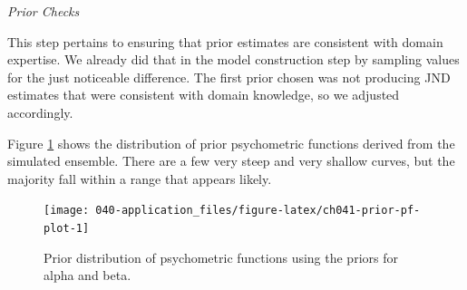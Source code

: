 \documentclass[11pt, oneside, openany]{scrbook}
\newenvironment{Shaded}{\begin{snugshade}}{\end{snugshade}}
\newcommand{\AttributeTok}[1]{\textcolor[rgb]{0.77,0.63,0.00}{#1}}
\newcommand{\ConstantTok}[1]{\textcolor[rgb]{0.00,0.00,0.00}{#1}}
\newcommand{\DecValTok}[1]{\textcolor[rgb]{0.00,0.00,0.81}{#1}}
\newcommand{\FloatTok}[1]{\textcolor[rgb]{0.00,0.00,0.81}{#1}}
\newcommand{\FunctionTok}[1]{\textcolor[rgb]{0.00,0.00,0.00}{#1}}
\newcommand{\NormalTok}[1]{#1}
\newcommand{\OtherTok}[1]{\textcolor[rgb]{0.56,0.35,0.01}{#1}}
\newcommand{\SpecialCharTok}[1]{\textcolor[rgb]{0.00,0.00,0.00}{#1}}
\begin{document}
\begin{Shaded}
\end{Shaded}


\emph{Prior Checks}

This step pertains to ensuring that prior estimates are consistent with domain expertise. We already did that in the model construction step by sampling values for the just noticeable difference. The first prior chosen was not producing JND estimates that were consistent with domain knowledge, so we adjusted accordingly.

Figure \ref{fig:ch041-prior-pf-plot} shows the distribution of prior psychometric functions derived from the simulated ensemble. There are a few very steep and very shallow curves, but the majority fall within a range that appears likely.

\begin{figure}

{\centering \texttt{[image: 040-application\_files/figure-latex/ch041-prior-pf-plot-1]} 

}

\caption{Prior distribution of psychometric functions using the priors for alpha and beta.}\label{fig:ch041-prior-pf-plot}
\end{figure}
\end{document}
